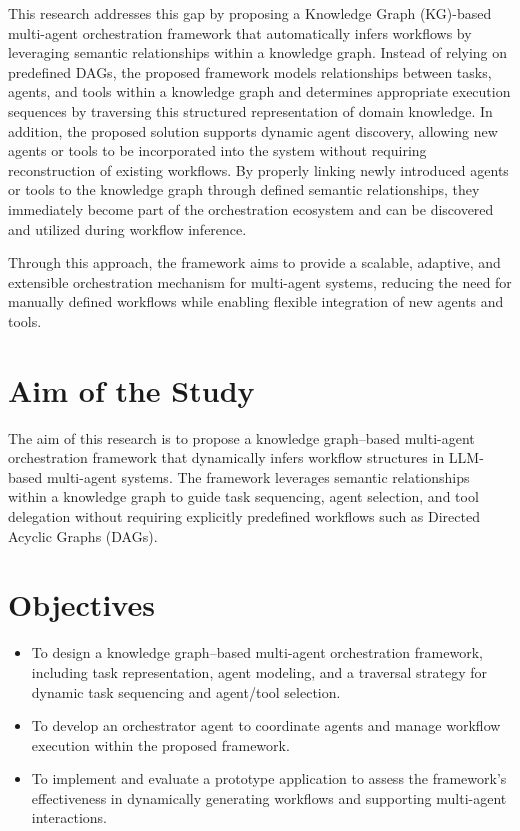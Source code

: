 \noindent This research addresses this gap by proposing a Knowledge Graph (KG)-based multi-agent orchestration framework that automatically infers workflows by leveraging semantic relationships within a knowledge graph. Instead of relying on predefined DAGs, the proposed framework models relationships between tasks, agents, and tools within a knowledge graph and determines appropriate execution sequences by traversing this structured representation of domain knowledge.
In addition, the proposed solution supports dynamic agent discovery, allowing new agents or tools to be incorporated into the system without requiring reconstruction of existing workflows. By properly linking newly introduced agents or tools to the knowledge graph through defined semantic relationships, they immediately become part of the orchestration ecosystem and can be discovered and utilized during workflow inference.

\noindent Through this approach, the framework aims to provide a scalable, adaptive, and extensible orchestration mechanism for multi-agent systems, reducing the need for manually defined workflows while enabling flexible integration of new agents and tools.

\section{Aim of the Study}
The aim of this research is to propose a knowledge graph–based multi-agent orchestration framework that dynamically infers workflow structures in LLM-based multi-agent systems. The framework leverages semantic relationships within a knowledge graph to guide task sequencing, agent selection, and tool delegation without requiring explicitly predefined workflows such as Directed Acyclic Graphs (DAGs).

\section{Objectives}
\begin{itemize}
\item To design a knowledge graph–based multi-agent orchestration framework, including task representation, agent modeling, and a traversal strategy for dynamic task sequencing and agent/tool selection.
\item To develop an orchestrator agent to coordinate agents and manage workflow execution within the proposed framework.
\item To implement and evaluate a prototype application to assess the framework’s effectiveness in dynamically generating workflows and supporting multi-agent interactions.
\end{itemize}


